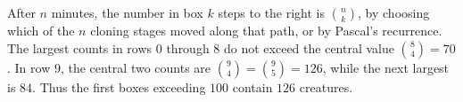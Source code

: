 After $n$ minutes, the number in box $k$ steps to the right is $\binom nk$, by choosing which of the $n$ cloning stages moved along that path, or by Pascal's recurrence. The largest counts in rows $0$ through $8$ do not exceed the central value $\binom84=70$. In row $9$, the central two counts are $\binom94=\binom95=126$, while the next largest is $84$. Thus the first boxes exceeding $100$ contain $\boxed{126}$ creatures.
